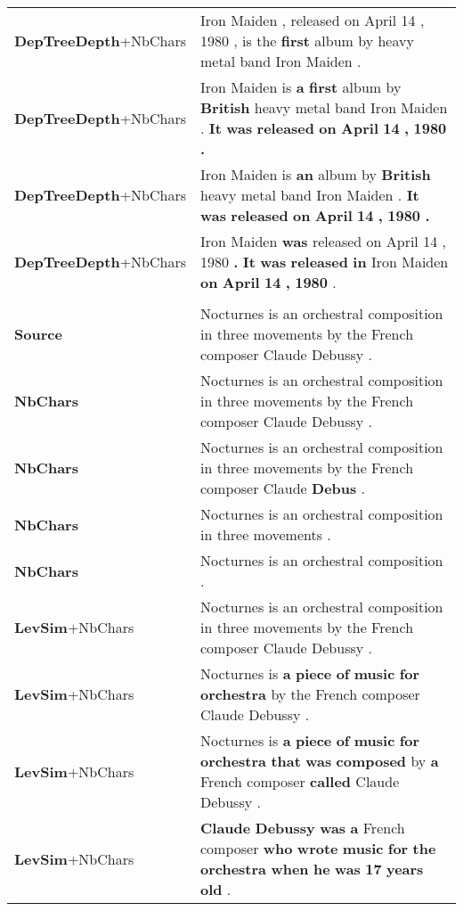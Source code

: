 \documentclass[10pt, a4paper]{article}
\begin{document}
\begin{table*}
{\begin{tabular}{ll}
\midrule
\textbf{DepTreeDepth}\footnotesize{+NbChars} & Iron Maiden , released on April 14 , 1980 , is the \textbf{first} album by heavy metal band Iron Maiden . \\
\textbf{DepTreeDepth}\footnotesize{+NbChars} & Iron Maiden is \textbf{a} \textbf{first} album by \textbf{British} heavy metal band Iron Maiden . \textbf{It} \textbf{was} \textbf{released} \textbf{on} \textbf{April} \textbf{14} \textbf{,} \textbf{1980} \textbf{.} \\
\textbf{DepTreeDepth}\footnotesize{+NbChars} & Iron Maiden is \textbf{an} album by \textbf{British} heavy metal band Iron Maiden . \textbf{It} \textbf{was} \textbf{released} \textbf{on} \textbf{April} \textbf{14} \textbf{,} \textbf{1980} \textbf{.} \\
\textbf{DepTreeDepth}\footnotesize{+NbChars} & Iron Maiden \textbf{was} released on April 14 , 1980 \textbf{.} \textbf{It} \textbf{was} \textbf{released} \textbf{in} Iron Maiden \textbf{on} \textbf{April} \textbf{14} \textbf{,} \textbf{1980} . \\
\midrule
& \\ \midrule
\textbf{Source} & Nocturnes is an orchestral composition in three movements by the French composer Claude Debussy . \\
\midrule
\textbf{NbChars} & Nocturnes is an orchestral composition in three movements by the French composer Claude Debussy . \\
\textbf{NbChars} & Nocturnes is an orchestral composition in three movements by the French composer Claude \textbf{Debus} . \\
\textbf{NbChars} & Nocturnes is an orchestral composition in three movements . \\
\textbf{NbChars} & Nocturnes is an orchestral composition . \\
\midrule
\textbf{LevSim}\footnotesize{+NbChars} & Nocturnes is an orchestral composition in three movements by the French composer Claude Debussy . \\
\textbf{LevSim}\footnotesize{+NbChars} & Nocturnes is \textbf{a} \textbf{piece} \textbf{of} \textbf{music} \textbf{for} \textbf{orchestra} by the French composer Claude Debussy . \\
\textbf{LevSim}\footnotesize{+NbChars} & Nocturnes is \textbf{a} \textbf{piece} \textbf{of} \textbf{music} \textbf{for} \textbf{orchestra} \textbf{that} \textbf{was} \textbf{composed} by \textbf{a} French composer \textbf{called} Claude Debussy . \\
\textbf{LevSim}\footnotesize{+NbChars} & \textbf{Claude} \textbf{Debussy} \textbf{was} \textbf{a} French composer \textbf{who} \textbf{wrote} \textbf{music} \textbf{for} \textbf{the} \textbf{orchestra} \textbf{when} \textbf{he} \textbf{was} \textbf{17} \textbf{years} \textbf{old} . \\

\end{tabular}}
\end{table*}
\end{document}
